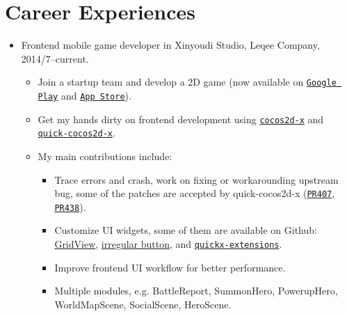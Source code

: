 \documentclass[letterpaper]{article}
\begin{document}
\section*{Career Experiences}
\begin{itemize}
  \item Frontend mobile game developer in Xinyoudi Studio, Leqee Company, 2014/7--current.
	\begin{itemize}
      \item Join a startup team and develop a 2D game (now available on 
          \href{https://play.google.com/store/apps/details?id=com.game168.yysg}{\tt Google Play} and
          \href{https://itunes.apple.com/us/app/ye-ye-san-guo/id976517523?mt=8}{\tt App Store}).
      \item Get my hands dirty on frontend development using \href{http://cocos2d-x.org/}{\tt cocos2d-x} and \href{https://github.com/dualface/v3quick}{\tt quick-cocos2d-x}.
      \item My main contributions include:
          \begin{itemize}
              \item Trace errors and crash, work on fixing or workarounding upstream bug, some of the patches are accepted by quick-cocos2d-x (\href{https://github.com/dualface/v3quick/pull/407}{\tt PR407}, \href{https://github.com/dualface/v3quick/pull/438}{\tt PR438}).
              \item Customize UI widgets, some of them are available on Github: \href{https://github.com/yszheda/cocos2d-x-GridView}{GridView}, \href{https://github.com/yszheda/cocos2d-x-irregular-button}{irregular button}, and \href{https://github.com/yszheda/quickx-extensions}{\tt quickx-extensions}.
             \item Improve frontend UI workflow for better performance.
             \item Multiple modules, e.g. BattleReport, SummonHero, PowerupHero, WorldMapScene, SocialScene, HeroScene.
          \end{itemize}
  \end{itemize}
\end{itemize}
\end{document}
